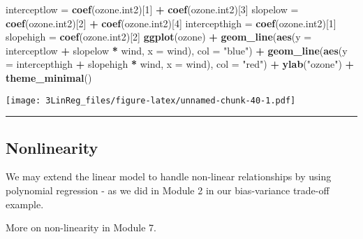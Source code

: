 \documentclass[]{article}
\newenvironment{Shaded}{\begin{snugshade}}{\end{snugshade}}
\newcommand{\DataTypeTok}[1]{\textcolor[rgb]{0.13,0.29,0.53}{#1}}
\newcommand{\DecValTok}[1]{\textcolor[rgb]{0.00,0.00,0.81}{#1}}
\newcommand{\KeywordTok}[1]{\textcolor[rgb]{0.13,0.29,0.53}{\textbf{#1}}}
\newcommand{\NormalTok}[1]{#1}
\newcommand{\OperatorTok}[1]{\textcolor[rgb]{0.81,0.36,0.00}{\textbf{#1}}}
\newcommand{\StringTok}[1]{\textcolor[rgb]{0.31,0.60,0.02}{#1}}
\begin{document}
\begin{Shaded}
\begin{Highlighting}[]
\NormalTok{interceptlow =}\StringTok{ }\KeywordTok{coef}\NormalTok{(ozone.int2)[}\DecValTok{1}\NormalTok{] }\OperatorTok{+}\StringTok{ }\KeywordTok{coef}\NormalTok{(ozone.int2)[}\DecValTok{3}\NormalTok{]}
\NormalTok{slopelow =}\StringTok{ }\KeywordTok{coef}\NormalTok{(ozone.int2)[}\DecValTok{2}\NormalTok{] }\OperatorTok{+}\StringTok{ }\KeywordTok{coef}\NormalTok{(ozone.int2)[}\DecValTok{4}\NormalTok{]}
\NormalTok{intercepthigh =}\StringTok{ }\KeywordTok{coef}\NormalTok{(ozone.int2)[}\DecValTok{1}\NormalTok{]}
\NormalTok{slopehigh =}\StringTok{ }\KeywordTok{coef}\NormalTok{(ozone.int2)[}\DecValTok{2}\NormalTok{]}
\KeywordTok{ggplot}\NormalTok{(ozone) }\OperatorTok{+}\StringTok{ }\KeywordTok{geom_line}\NormalTok{(}\KeywordTok{aes}\NormalTok{(}\DataTypeTok{y =}\NormalTok{ interceptlow }\OperatorTok{+}\StringTok{ }\NormalTok{slopelow }\OperatorTok{*}\StringTok{ }\NormalTok{wind, }\DataTypeTok{x =}\NormalTok{ wind), }
    \DataTypeTok{col =} \StringTok{"blue"}\NormalTok{) }\OperatorTok{+}\StringTok{ }\KeywordTok{geom_line}\NormalTok{(}\KeywordTok{aes}\NormalTok{(}\DataTypeTok{y =}\NormalTok{ intercepthigh }\OperatorTok{+}\StringTok{ }\NormalTok{slopehigh }\OperatorTok{*}\StringTok{ }\NormalTok{wind, }
    \DataTypeTok{x =}\NormalTok{ wind), }\DataTypeTok{col =} \StringTok{"red"}\NormalTok{) }\OperatorTok{+}\StringTok{ }\KeywordTok{ylab}\NormalTok{(}\StringTok{"ozone"}\NormalTok{) }\OperatorTok{+}\StringTok{ }\KeywordTok{theme_minimal}\NormalTok{()}
\end{Highlighting}
\end{Shaded}

\texttt{[image: 3LinReg\_files/figure-latex/unnamed-chunk-40-1.pdf]}

\normalsize

\begin{center}\rule{0.5\linewidth}{\linethickness}\end{center}

\hypertarget{nonlinearity}{%
\subsection{Nonlinearity}\label{nonlinearity}}

We may extend the linear model to handle non-linear relationships by
using polynomial regression - as we did in Module 2 in our bias-variance
trade-off example.

More on non-linearity in Module 7.
\end{document}
